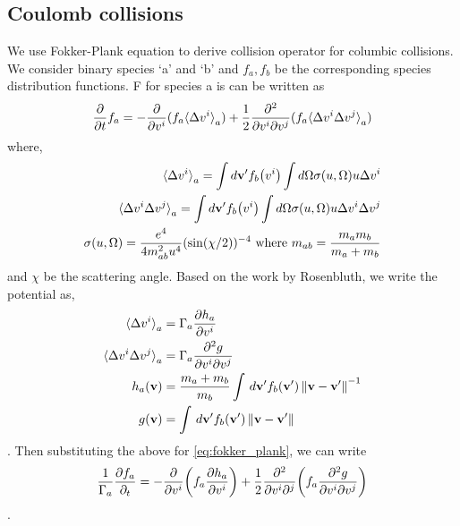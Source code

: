 \documentclass{article}[draft]
\begin{document}
\newpage
\subsection{Coulomb collisions}
We use Fokker-Plank equation to derive collision operator for columbic collisions. We consider binary species `a' and `b' and $f_a, f_b$ be the corresponding species distribution functions. 
F for species a is can be written as
\begin{align}
	\ppartial{f_a}{t} = -\ppartial{(f_a {\langle\Delta v^{i}\rangle}_a)}{v^i} + \frac{1}{2} \frac{\partial^2}{\partial v^i \partial v^j} (f_a{\langle \Delta v^i \Delta v^j\rangle}_a) \label{eq:fokker_plank}
\end{align}where, 
\begin{align*}
	{\langle \Delta v^{i}\rangle}_a = \int d\vect{v^\prime} f_b\of{v^i} \int d\Omega \sigma \of {u, \Omega} u \Delta v^i \\
	{\langle \Delta v^i \Delta v^j\rangle}_a = \int d\vect{v^\prime} f_b\of{v^i} \int d\Omega \sigma \of {u, \Omega} u \Delta v^i \Delta v^j  \\
	\sigma\of{u, \Omega} = \frac{e^4}{4m_{ab}^2 u^4} (\sin\of{\chi/2})^{-4} \text{ where } m_{ab} = \frac{m_a m_b}{m_a + m_b}
\end{align*} and $\chi$ be the scattering angle. Based on the work by Rosenbluth\cite{rosenbluth1957fokker}, we write the potential as, 
\begin{align*}
	{\langle \Delta v^{i}\rangle}_a &= \Gamma_a \frac{\partial h_a}{\partial v^i} \\
	{\langle \Delta v^i \Delta v^j\rangle}_a &= \Gamma_a \frac{\partial^2 g}{\partial v^i \partial v^j}  \\
	h_a\of{\vect{v}} &= \frac{m_a + m_b}{m_b} \int \diff{\vect{v^\prime}} f_b \of{\vect{v^\prime}} \norm{\vect{v}- \vect{v^\prime}}^{-1}\\
	g\of{\vect{v}} &= \int \diff{\vect{v^\prime}} f_b \of{\vect{v^\prime}} \norm{\vect{v}- \vect{v^\prime}}
\end{align*}. Then substituting the above for \eqref{eq:fokker_plank}, we can write
\begin{align}
	\frac{1}{\Gamma_a} \frac{\partial f_a}{\partial_t} = -\ppartial{\of{f_a \frac{\partial h_a}{\partial v^i}}}{v^i} + \frac{1}{2} \frac{\partial^2}{\partial v^i \partial^j} \of{f_a \frac{\partial^2 g}{\partial v^i \partial v^j}}
\end{align}. 

\newpage
\end{document}
